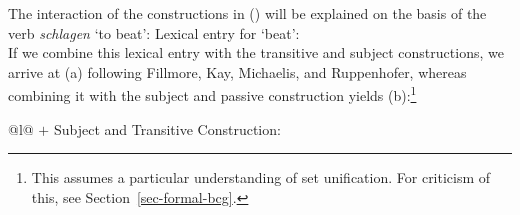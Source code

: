 The interaction of the constructions in () will be explained on the basis of the verb \emph{schlagen} `to beat':
\eas
Lexical entry for  `beat':\\
\zs
If we combine this lexical entry with the transitive and subject constructions, we arrive at
(a) following Fillmore, Kay, Michaelis, and Ruppenhofer,
whereas combining it with the subject and passive construction yields (b):\footnote{%
	This assumes a particular understanding of set unification. For criticism of this, see Section~\ref{sec-formal-bcg}.
}
\eal
\label{ex-schlagen-linking}
\ex 
\label{ex-schlagen-transitive}
\begin{tabular}[t]{@{}l@{}}
 $+$ Subject and Transitive Construction:\\
\end{tabular}
\ex
\label{ex-schlagen-passive}
